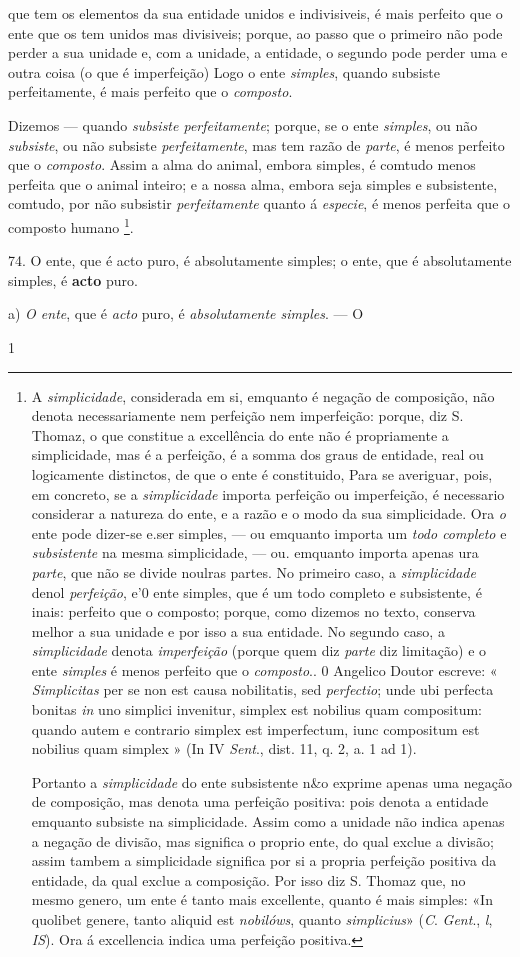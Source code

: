  que tem os elementos da sua entidade unidos e indivisiveis, é mais perfeito que o ente que os tem unidos mas divisiveis; porque, ao passo que o primeiro não pode perder a sua unidade e, com a unidade, a entidade, o segundo pode perder uma e outra coisa (o que é imperfeição) Logo o ente \emph{simples}, quando subsiste perfeitamente, é mais perfeito que o \emph{composto}.

Dizemos --- quando \emph{subsiste perfeitamente}; porque, se o ente \emph{simples}, ou não \emph{subsiste}, ou não subsiste \emph{perfeitamente}, mas tem razão de \emph{parte}, é menos perfeito que o \emph{composto}. Assim a alma do animal, embora simples, é comtudo menos perfeita que o animal inteiro; e a nossa alma, embora seja simples e subsistente, comtudo, por não subsistir \emph{perfeitamente} quanto á \emph{especie}, é menos perfeita que o composto humano \footnote{A \emph{simplicidade}, considerada em si, emquanto é negação de composição, não denota necessariamente nem perfeição nem imperfeição: porque, diz S. Thomaz, o que constitue a excellência do ente não é propriamente a simplicidade, mas é a perfeição, é a somma dos graus de entidade, real ou logicamente distinctos, de que o ente é constituido, Para se averiguar, pois, em concreto, se a \emph{simplicidade} importa perfeição ou imperfeição, é necessario considerar a natureza do ente, e a razão e o modo da sua simplicidade. Ora \emph{o} ente pode dizer-se e.ser simples, --- ou emquanto importa um \emph{todo completo} e \emph{subsistente} na mesma simplicidade, --- ou. emquanto importa apenas ura \emph{parte}, que não se divide noulras partes. No primeiro caso, a \emph{simplicidade} denol \emph{perfeição}, e'0 ente simples, que é um todo completo e subsistente, é inais: perfeito que o composto; porque, como dizemos no texto, conserva melhor a sua unidade e por isso a sua entidade. No segundo caso, a \emph{simplicidade} denota \emph{imperfeição} (porque quem diz \emph{parte} diz limitação) e o ente \emph{simples} é menos perfeito que o \emph{composto}.. 0 Angelico Doutor escreve: « \emph{Simplicitas} per se non est causa nobilitatis, sed \emph{perfectio}; unde ubi perfecta bonitas \emph{in} uno simplici invenitur, simplex est nobilius quam compositum: quando autem e contrario simplex est imperfectum, iunc compositum est nobilius quam simplex » (In IV \emph{Sent}., dist. 11, q. 2, a. 1 ad 1).\par Portanto a \emph{simplicidade} do ente subsistente n\&o exprime apenas uma negação de composição, mas denota uma perfeição positiva: pois denota a entidade emquanto subsiste na simplicidade. Assim como a unidade não indica apenas a negação de divisão, mas significa o proprio ente, do qual exclue a divisão; assim tambem a simplicidade significa por si a propria perfeição positiva da entidade, da qual exclue a composição. Por isso diz S. Thomaz que, no mesmo genero, um ente é tanto mais excellente, quanto é mais simples: «In quolibet genere, tanto aliquid est \emph{nobilóws}, quanto \emph{simplicius}» (\emph{C}. \emph{Gent}., \emph{l}, \emph{IS}). Ora á excellencia indica uma perfeição positiva.}.

74. O ente, que é acto puro, é absolutamente simples; o ente, que é absolutamente simples, é \textbf{acto} puro.

a) \emph{O ente}, que é \emph{acto} puro, é \emph{absolutamente simples}. --- O

1 